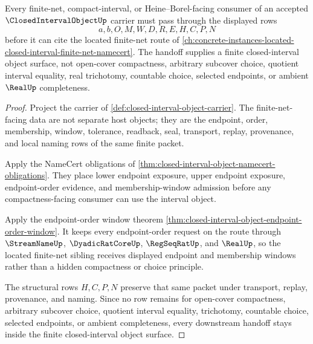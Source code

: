 \begin{theorem}
\label{thm:closed-interval-object-nonescape}
Every finite-net, compact-interval, or Heine--Borel-facing consumer of an accepted $\ClosedIntervalObjectUp$ carrier must pass through the displayed rows
$$
a,b,O,M,W,D,R,E,H,C,P,N
$$
before it can cite the located finite-net route of \autoref{ch:concrete-instances-located-closed-interval-finite-net-namecert}. The handoff supplies a finite closed-interval object surface, not open-cover compactness, arbitrary subcover choice, quotient interval equality, real trichotomy, countable choice, selected endpoints, or ambient $\RealUp$ completeness.
\end{theorem}
\begin{proof}
Project the carrier of \autoref{def:closed-interval-object-carrier}. The finite-net-facing data are not separate host objects; they are the endpoint, order, membership, window, tolerance, readback, seal, transport, replay, provenance, and local naming rows of the same finite packet.

Apply the NameCert obligations of \autoref{thm:closed-interval-object-namecert-obligations}. They place lower endpoint exposure, upper endpoint exposure, endpoint-order evidence, and membership-window admission before any compactness-facing consumer can use the interval object.

Apply the endpoint-order window theorem \autoref{thm:closed-interval-object-endpoint-order-window}. It keeps every endpoint-order request on the route through $\StreamNameUp$, $\DyadicRatCoreUp$, $\RegSeqRatUp$, and $\RealUp$, so the located finite-net sibling receives displayed endpoint and membership windows rather than a hidden compactness or choice principle.

The structural rows $H,C,P,N$ preserve that same packet under transport, replay, provenance, and naming. Since no row remains for open-cover compactness, arbitrary subcover choice, quotient interval equality, trichotomy, countable choice, selected endpoints, or ambient completeness, every downstream handoff stays inside the finite closed-interval object surface.
\end{proof}


